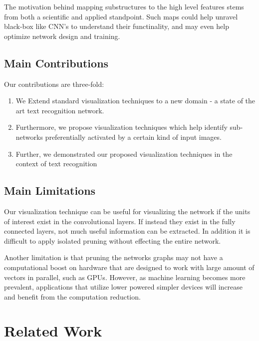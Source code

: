 \documentclass[10pt,twocolumn,letterpaper]{article}
\begin{document}
The motivation behind mapping substructures to the high level features stems from both a scientific and applied standpoint. Such maps could help unravel black-box like CNN's to understand their functinality, and may even help optimize network design and training.

\subsection{Main Contributions}
Our contributions are three-fold:
\begin{enumerate}
\item We Extend standard visualization techniques to a new domain - a state of the art text recognition network.

\item Furthermore, we propose visualization techniques which help identify sub-networks preferentially activated by a certain kind of input images.

\item Further, we demonstrated our proposed visualization techniques in the context of text recognition
\end{enumerate}

\subsection{Main Limitations}
Our visualization technique can be useful for visualizing the network if the units of interest exist in the convolutional layers. If instead they exist in the fully connected layers, not much useful information can be extracted. In addition it is difficult to apply isolated pruning without effecting the entire network.

Another limitation is that pruning the networks graphs may not have a computational boost on hardware that are designed to work with large amount of vectors in parallel, such as GPUs. However, as machine learning becomes more prevalent, applications that utilize lower powered simpler devices will increase and benefit from the computation reduction.

\section{Related Work}
\end{document}
